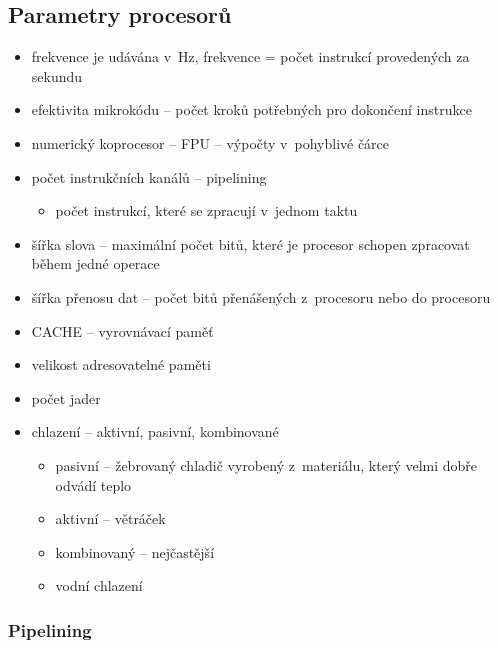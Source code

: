 \documentclass[a4paper,12pt]{article}
\providecommand{\tightlist}{%
\setlength{\itemsep}{0pt}\setlength{\parskip}{0pt}}
\begin{document}
\subsection{Parametry procesorů}

\begin{itemize}
\tightlist
\item frekvence je udávána v~Hz, frekvence = počet instrukcí provedených za
  sekundu
\item efektivita mikrokódu -- počet kroků potřebných pro dokončení instrukce
\item numerický koprocesor -- FPU -- výpočty v~pohyblivé čárce
\item počet instrukčních kanálů -- pipelining

  \begin{itemize}
  \tightlist
  \item počet instrukcí, které se zpracují v~jednom taktu
  \end{itemize}
\item šířka slova -- maximální počet bitů, které je procesor schopen
  zpracovat během jedné operace
\item šířka přenosu dat -- počet bitů přenášených z~procesoru nebo do
  procesoru
\item CACHE -- vyrovnávací paměť
\item velikost adresovatelné paměti
\item počet jader
\item chlazení -- aktivní, pasivní, kombinované

  \begin{itemize}
  \tightlist
  \item pasivní -- žebrovaný chladič vyrobený z~materiálu, který velmi dobře
    odvádí teplo
  \item aktivní -- větráček
  \item kombinovaný -- nejčastější
  \item vodní chlazení
  \end{itemize}
\end{itemize}

\subsubsection{Pipelining}
\end{document}
